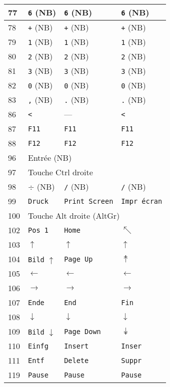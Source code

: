 \begin{longtable}{|l|l|l|l|}
  77 & \texttt{6} (NB) & \texttt{6} (NB) & \texttt{6} (NB) \\ \hline
  78 & \texttt{+} (NB) & \texttt{+} (NB) & \texttt{+} (NB) \\ \hline
  79 & \texttt{1} (NB) & \texttt{1} (NB) & \texttt{1} (NB) \\ \hline
  80 & \texttt{2} (NB) & \texttt{2} (NB) & \texttt{2} (NB) \\ \hline
  81 & \texttt{3} (NB) & \texttt{3} (NB) & \texttt{3} (NB) \\ \hline
  82 & \texttt{0} (NB) & \texttt{0} (NB) & \texttt{0} (NB) \\ \hline
  83 & \texttt{,} (NB) & \texttt{.} (NB) & \texttt{.} (NB) \\ \hline
  86 & \texttt{<} & --- & \texttt{<} \\ \hline
  87 & \texttt{F11} & \texttt{F11} & \texttt{F11} \\ \hline
  88 & \texttt{F12} & \texttt{F12} & \texttt{F12} \\ \hline
  96 & \multicolumn{3}{|l|}{Entrée (NB)} \\ \hline
  97 & \multicolumn{3}{|l|}{Touche Ctrl droite} \\ \hline
  98 & $\div$ (NB) & \texttt{/} (NB) & \texttt{/} (NB) \\ \hline
  99 & \texttt{Druck} & \texttt{Print Screen} & \texttt{Impr écran} \\ \hline
  100 & \multicolumn{3}{|l|}{Touche Alt droite (AltGr)} \\ \hline
  102 & \texttt{Pos 1} & \texttt{Home} & $\nwarrow$ \\ \hline
  103 & $\uparrow$ & $\uparrow$ & $\uparrow$ \\ \hline
  104 & \texttt{Bild} $\uparrow$ & \texttt{Page Up} & $\twoheaduparrow$ \\ \hline
  105 & $\leftarrow$ & $\leftarrow$ & $\leftarrow$ \\ \hline
  106 & $\rightarrow$ & $\rightarrow$ & $\rightarrow$ \\ \hline
  107 & \texttt{Ende} & \texttt{End} & \texttt{Fin} \\ \hline
  108 & $\downarrow$ & $\downarrow$ & $\downarrow$ \\ \hline
  109 & \texttt{Bild} $\downarrow$ & \texttt{Page Down} & $\twoheaddownarrow$ \\ \hline
  110 & \texttt{Einfg} & \texttt{Insert} & \texttt{Inser} \\ \hline
  111 & \texttt{Entf} & \texttt{Delete} & \texttt{Suppr} \\ \hline
  119 & \texttt{Pause} & \texttt{Pause} & \texttt{Pause} \\ \hline
\end{longtable}

